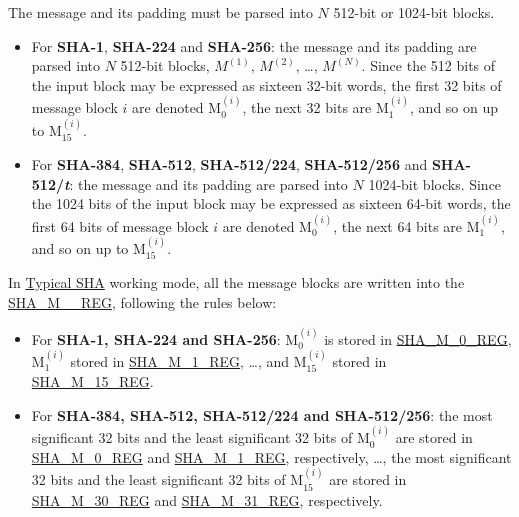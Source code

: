 \documentclass[main\_\_EN.tex]{subfiles}
\begin{document}
The message and its padding must be parsed into \begin{math}N\end{math} 512-bit or 1024-bit blocks.

\begin{itemize}
    \item For \textbf{SHA-1}, \textbf{SHA-224} and \textbf{SHA-256}: the message and its padding are parsed into \begin{math}N\end{math} 512-bit blocks, \begin{math}M^{(1)}\end{math}, \begin{math}M^{(2)}\end{math}, \dots, \begin{math}M^{(N)}\end{math}. Since the 512 bits of the input block may be expressed as sixteen 32-bit words, the first 32 bits of message block \begin{math}i\end{math} are denoted M$^{(i)}_{0}$, the next 32 bits are M$^{(i)}_{1}$, and so on up to M$^{(i)}_{15}$.
    \item For \textbf{SHA-384}, \textbf{SHA-512}, \textbf{SHA-512/224}, \textbf{SHA-512/256} and \textbf{SHA-512/{\it{t}}}: the message and its padding are parsed into \begin{math}N\end{math} 1024-bit blocks. Since the 1024 bits of the input block may be expressed as sixteen 64-bit words, the first 64 bits of message block \begin{math}i\end{math} are denoted M$^{(i)}_{0}$, the next 64 bits are M$^{(i)}_{1}$, and so on up to M$^{(i)}_{15}$.
\end{itemize}

In \hyperref[subsection:typicalsha]{Typical SHA} working mode, all the message blocks are written into the \hyperref[regdesc:SHAMNREG]{SHA\_M\_\_REG}, following the rules below:
\begin{itemize}
    \item For \textbf{SHA-1, SHA-224 and SHA-256}: M$^{(i)}_{0}$ is stored in \hyperref[regdesc:SHAMNREG]{SHA\_M\_0\_REG}, M$^{(i)}_1$ stored in \hyperref[regdesc:SHAMNREG]{SHA\_M\_1\_REG}, \dots, and M$^{(i)}_{15}$ stored in \hyperref[regdesc:SHAMNREG]{SHA\_M\_15\_REG}.
    \item For \textbf{SHA-384, SHA-512, SHA-512/224 and SHA-512/256}: the most significant 32 bits and the least significant 32 bits of M$^{(i)}_0 $ are stored in \hyperref[regdesc:SHAMNREG]{SHA\_M\_0\_REG} and \hyperref[regdesc:SHAMNREG]{SHA\_M\_1\_REG}, respectively, \dots, the most significant 32 bits and the least significant 32 bits of M$^{(i)}_{15}$ are stored in \hyperref[regdesc:SHAMNREG]{SHA\_M\_30\_REG} and \hyperref[regdesc:SHAMNREG]{SHA\_M\_31\_REG}, respectively.

\end{itemize}
\end{document}
